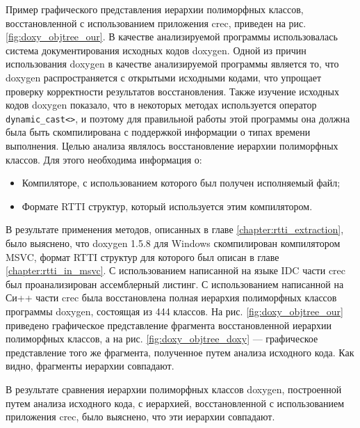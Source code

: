 Пример графического представления иерархии полиморфных классов, восстановленной с использованием приложения crec, приведен на рис. \ref{fig:doxy_objtree_our}. В качестве анализируемой программы использовалась система документирования исходных кодов doxygen. Одной из причин использования doxygen в качестве анализируемой программы является то, что doxygen распространяется с открытыми исходными кодами, что упрощает проверку корректности результатов восстановления. Также изучение исходных кодов doxygen показало, что в некоторых методах используется оператор \lstinline{dynamic_cast<>}, и поэтому для правильной работы этой программы она должна была быть скомпилирована с поддержкой информации о типах времени выполнения. Целью анализа являлось восстановление иерархии полиморфных классов. Для этого необходима информация о:
\begin{itemize}
\item Компиляторе, с использованием которого был получен исполняемый файл;
\item Формате RTTI структур, который используется этим компилятором.
\end{itemize}

В результате применения методов, описанных в главе \ref{chapter:rtti_extraction}, было выяснено, что doxygen 1.5.8 для Windows скомпилирован компилятором MSVC, формат RTTI структур для которого был описан в главе \ref{chapter:rtti_in_msvc}. С использованием написанной на языке IDC части crec был проанализирован ассемблерный листинг. С использованием написанной на Си++ части crec была восстановлена полная иерархия полиморфных классов программы doxygen, состоящая из 444 классов. На рис. \ref{fig:doxy_objtree_our} приведено графическое представление фрагмента восстановленной иерархии полиморфных классов, а на рис. \ref{fig:doxy_objtree_doxy} --- графическое представление того же фрагмента, полученное путем анализа исходного кода. Как видно, фрагменты иерархии совпадают.

В результате сравнения иерархии полиморфных классов doxygen, построенной путем анализа исходного кода, с иерархией, восстановленной с использованием приложения crec, было выяснено, что эти иерархии совпадают.




